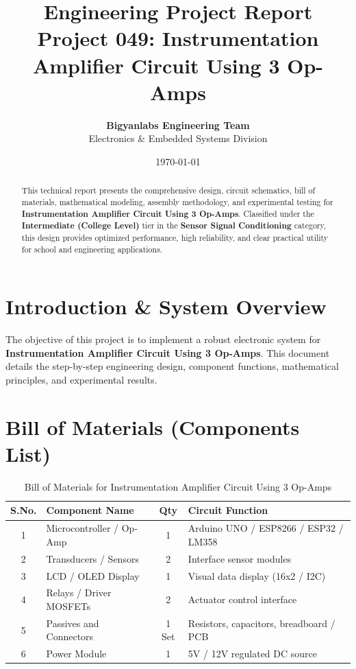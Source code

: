\documentclass[11pt,a4paper]{article}
\title{\textbf{\Huge Engineering Project Report}\\[0.5em] \Large Project 049: Instrumentation Amplifier Circuit Using 3 Op-Amps}
\author{\textbf{Bigyanlabs Engineering Team}\\ Electronics \& Embedded Systems Division}
\date{\today}
\begin{document}
\maketitle
\thispagestyle{empty}

\begin{abstract}
This technical report presents the comprehensive design, circuit schematics, bill of materials, mathematical modeling, assembly methodology, and experimental testing for \textbf{Instrumentation Amplifier Circuit Using 3 Op-Amps}. Classified under the \textbf{Intermediate (College Level)} tier in the \textbf{Sensor Signal Conditioning} category, this design provides optimized performance, high reliability, and clear practical utility for school and engineering applications.
\end{abstract}

\newpage
\tableofcontents
\newpage

\section{Introduction \& System Overview}
The objective of this project is to implement a robust electronic system for \textbf{Instrumentation Amplifier Circuit Using 3 Op-Amps}. This document details the step-by-step engineering design, component functions, mathematical principles, and experimental results.

\section{Bill of Materials (Components List)}
\begin{table}[h!]
\centering
\caption{Bill of Materials for Instrumentation Amplifier Circuit Using 3 Op-Amps}
\vspace{0.5em}
\begin{tabular}{clcp{7cm}}
\toprule
\textbf{S.No.} & \textbf{Component Name} & \textbf{Qty} & \textbf{Circuit Function} \\
\midrule
1 & Microcontroller / Op-Amp & 1 & Arduino UNO / ESP8266 / ESP32 / LM358 \\
2 & Transducers / Sensors & 2 & Interface sensor modules \\
3 & LCD / OLED Display & 1 & Visual data display (16x2 / I2C) \\
4 & Relays / Driver MOSFETs & 2 & Actuator control interface \\
5 & Passives and Connectors & 1 Set & Resistors, capacitors, breadboard / PCB \\
6 & Power Module & 1 & 5V / 12V regulated DC source \\
\bottomrule
\end{tabular}
\end{table}
\end{document}
